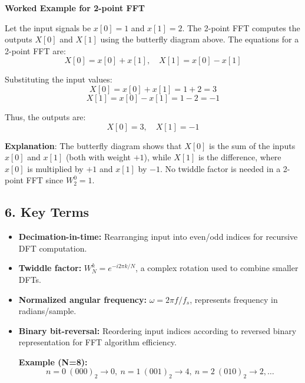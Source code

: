 \documentclass[a4paper,12pt]{article}
\begin{document}
\vspace{1cm}

\begin{minipage}{\textwidth}
  \textbf{Worked Example for 2-point FFT}

  Let the input signals be \( x[0] = 1 \) and \( x[1] = 2 \). The 2-point FFT computes the outputs \( X[0] \) and \( X[1] \) using the butterfly diagram above. The equations for a 2-point FFT are:
  \[
  X[0] = x[0] + x[1], \quad X[1] = x[0] - x[1]
  \]

  Substituting the input values:
  \[
  X[0] = x[0] + x[1] = 1 + 2 = 3
  \]
  \[
  X[1] = x[0] - x[1] = 1 - 2 = -1
  \]

  Thus, the outputs are:
  \[
  X[0] = 3, \quad X[1] = -1
  \]

  \textbf{Explanation}: The butterfly diagram shows that \( X[0] \) is the sum of the inputs \( x[0] \) and \( x[1] \) (both with weight \( +1 \)), while \( X[1] \) is the difference, where \( x[0] \) is multiplied by \( +1 \) and \( x[1] \) by \( -1 \). No twiddle factor is needed in a 2-point FFT since \( W_2^0 = 1 \).
\end{minipage}

\subsection{6. Key Terms}

\begin{itemize}
    \item \textbf{Decimation-in-time:} Rearranging input into even/odd indices for recursive DFT computation.
    \item \textbf{Twiddle factor:} $W_N^k = e^{-i 2\pi k / N}$, a complex rotation used to combine smaller DFTs.
    \item \textbf{Normalized angular frequency:} $\omega = 2 \pi f / f_s$, represents frequency in radians/sample.
    \item \textbf{Binary bit-reversal:} Reordering input indices according to reversed binary representation for FFT algorithm efficiency.
    
    \textbf{Example (N=8):}
    \[
    n = 0~(000)_2 \to 0,~ n=1~(001)_2 \to 4,~ n=2~(010)_2 \to 2, \dots
    \]
\end{itemize}
\end{document}
